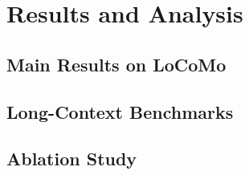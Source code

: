 \section{Results and Analysis}
\label{sec:results}

\subsection{Main Results on LoCoMo}
\label{sec:results-locomo}

\subsection{Long-Context Benchmarks}
\label{sec:results-longctx}

\subsection{Ablation Study}
\label{sec:results-ablation}



